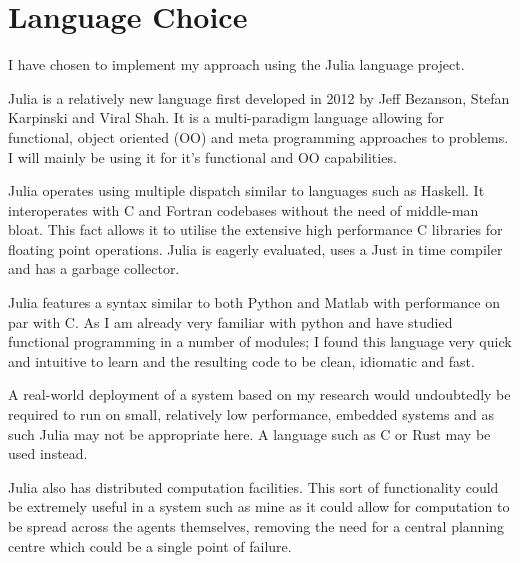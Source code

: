 \section{Language Choice}

I have chosen to implement my approach using the Julia language project\cite{JuliaProgrammingLanguage}.

Julia is a relatively new language first developed in 2012 by Jeff Bezanson, Stefan Karpinski and Viral Shah. It is a multi-paradigm language allowing for functional, object oriented (OO) and meta programming approaches to problems. I will mainly be using it for it's functional and OO capabilities.

Julia operates using multiple dispatch similar to languages such as Haskell. It interoperates with C and Fortran codebases without the need of middle-man bloat. This fact allows it to utilise the extensive high performance C libraries for floating point operations. Julia is eagerly evaluated, uses a Just in time compiler and has a garbage collector.

Julia features a syntax similar to both Python and Matlab with performance on par with C. As I am already very familiar with python and have studied functional programming in a number of modules; I found this language very quick and intuitive to learn and the resulting code to be clean, idiomatic and fast.

A real-world deployment of a system based on my research would undoubtedly be required to run on small, relatively low performance, embedded systems and as such Julia may not be appropriate here. A language such as C or Rust may be used instead.

Julia also has distributed computation facilities. This sort of functionality could be extremely useful in a system such as mine as it could allow for computation to be spread across the agents themselves, removing the need for a central planning centre which could be a single point of failure.





